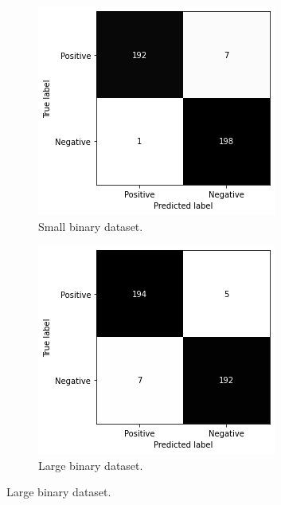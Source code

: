\begin{figure}
    \centering
    \begin{subfigure}[b]{0.49\textwidth}
        \centering
        \includegraphics[width=\textwidth]{figures/cm-orig-s-b.png}
        \caption{Small binary dataset.}
        \label{fig:cm-orig-s-b}
    \end{subfigure}
    \hfill
    \begin{subfigure}[b]{0.49\textwidth}
        \centering
        \includegraphics[width=\textwidth]{figures/cm-orig-l-b.png}
        \caption{Large binary dataset.}
        \label{fig:cm-orig-l-b}
    \end{subfigure}
    \vspace{10mm} %
    

\end{figure}
